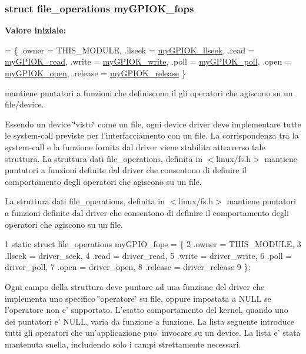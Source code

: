 \hypertarget{group___linux-_driver_gad1963bc01fffdbb315a408a9210cbafc}{
\subsubsection[{my\+G\+P\+I\+O\+K\+\_\+fops}]{\setlength{\rightskip}{0pt plus 5cm}struct file\+\_\+operations my\+G\+P\+I\+O\+K\+\_\+fops\hspace{0.3cm}{\ttfamily [static]}}}\label{group___linux-_driver_gad1963bc01fffdbb315a408a9210cbafc}
{\bfseries Valore iniziale\+:}
\begin{DoxyCode}
= \{
        .owner      = THIS\_MODULE,
        .llseek     = \hyperlink{group___linux-_driver_ga66e7f726b72320a272b633ecbaecefff}{myGPIOK\_llseek},
        .read       = \hyperlink{group___linux-_driver_ga90ac339df9c02ae5f11a2a7727adc923}{myGPIOK\_read},
        .write      = \hyperlink{group___linux-_driver_ga1eea0f6c86e8966ba9b701da57502aad}{myGPIOK\_write},
        .poll       = \hyperlink{group___linux-_driver_gaba935e8a8215c2ebce9a7147fd4f5147}{myGPIOK\_poll},
        .open       = \hyperlink{group___linux-_driver_gad013759c18fbf6ea96005b9b3bfa5b4e}{myGPIOK\_open},
        .release    = \hyperlink{group___linux-_driver_ga17ce7f574723246c790b70b06e3e7103}{myGPIOK\_release}
\}
\end{DoxyCode}


mantiene puntatori a funzioni che definiscono il gli operatori che agiscono su un file/device. 

Essendo un device \char`\"{}visto\char`\"{} come un file, ogni device driver deve implementare tutte le system-\/call previste per l'interfacciamento con un file. La corrispondenza tra la system-\/call e la funzione fornita dal driver viene stabilita attraverso tale struttura. La struttura dati file\+\_\+operations, definita in $<$linux/fs.\+h$>$ mantiene puntatori a funzioni definite dal driver che consentono di definire il comportamento degli operatori che agiscono su un file.

La struttura dati file\+\_\+operations, definita in $<$linux/fs.\+h$>$ mantiene puntatori a funzioni definite dal driver che consentono di definire il comportamento degli operatori che agiscono su un file. 
\begin{DoxyCode}
1 static struct file\_operations myGPIO\_fops = \{
2     .owner      = THIS\_MODULE,
3     .llseek     = driver\_seek,
4     .read       = driver\_read,
5     .write      = driver\_write,
6     .poll       = driver\_poll,
7     .open       = driver\_open,
8     .release    = driver\_release
9 \};
\end{DoxyCode}
 Ogni campo della struttura deve puntare ad una funzione del driver che implementa uno specifico \char`\"{}operatore\char`\"{} su file, oppure impostata a N\+U\+L\+L se l'operatore non e' supportato. L'esatto comportamento del kernel, quando uno dei puntatori e' N\+U\+L\+L, varia da funzione a funzione. La lista seguente introduce tutti gli operatori che un'applicazione puo' invocare su un device. La lista e' stata mantenuta snella, includendo solo i campi strettamente necessari.


